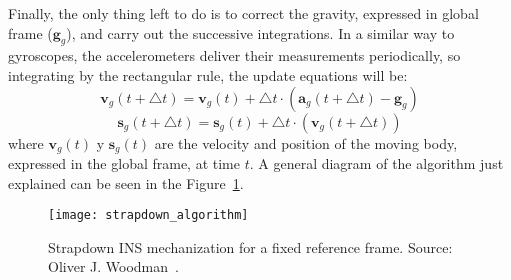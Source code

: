Finally, the only thing left to do is to correct the gravity, expressed in global frame ($\boldsymbol{g}_g$), and carry out the successive integrations.
In a similar way to gyroscopes, the accelerometers deliver their measurements periodically, so integrating by the rectangular rule, the update equations will be:
\begin{equation}
\label{eqn_acc_int}
	\boldsymbol{v}_g(t+\triangle t)=\boldsymbol{v}_g(t)+\triangle t \cdot (\boldsymbol{a}_g(t+\triangle t)-\boldsymbol{g}_g)
\end{equation}
\begin{equation}
\label{eqn_vel_int}
	\boldsymbol{s}_g(t+\triangle t)=\boldsymbol{s}_g(t)+\triangle t \cdot (\boldsymbol{v}_g(t+\triangle t))
\end{equation}
where $\boldsymbol{v}_g(t)$ y $\boldsymbol{s}_g(t)$ are the velocity and position of the moving body, expressed in the global frame, at time $t$.
A general diagram of the algorithm just explained can be seen in the Figure~\ref{fig:strapdown_algorithm}.
\begin{figure}[!t]
    \centering
	\texttt{[image: strapdown\_algorithm]}    	
	\caption[Strapdown INS mechanization for a fixed reference frame]{Strapdown INS mechanization for a fixed reference frame. Source: Oliver J. Woodman~\cite{woodman_introduction_2007}.}
	\label{fig:strapdown_algorithm}
\end{figure}
